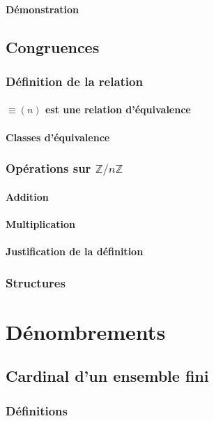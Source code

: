 \documentclass[12pt,a4paper,french]{book}
\begin{document}
			\subsubsection{Démonstration}
	\section{Congruences}
		\subsection{Définition de la relation}
			\subsubsection{$\equiv (n)$ est une relation d'équivalence}
			\subsubsection{Classes d'équivalence}
		\subsection{Opérations sur $\mathbb{Z}/ n\mathbb{Z}$}
			\subsubsection{Addition}
			\subsubsection{Multiplication}
			\subsubsection{Justification de la définition}
		\subsection{Structures}
		
\chapter{Dénombrements}
	\section{Cardinal d'un ensemble fini}
		\subsection{Définitions}
\end{document}
